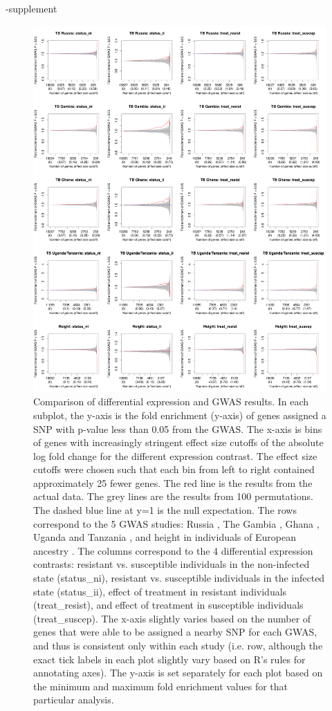 \documentclass[fleqn,10pt]{wlscirep}
\begin{document}
\begin{filecontents}{\jobname-supplement}
\begin{figure}[ht]
\centering
\includegraphics[width=6in]{../figure/gwas-supp.pdf}
\caption{
Comparison of differential expression and GWAS results. In each
subplot, the y-axis is the fold enrichment (y-axis) of genes assigned
a SNP with p-value less than 0.05 from the GWAS. The x-axis is bins of
genes with increasingly stringent effect size cutoffs of the absolute
log fold change for the different expression contrast. The effect size
cutoffs were chosen such that each bin from left to right contained
approximately 25 fewer genes. The red line is the results from the
actual data. The grey lines are the results from 100 permutations. The
dashed blue line at y=1 is the null expectation. The rows correspond
to the 5 GWAS studies: Russia \cite{Curtis2015}, The Gambia
\cite{Thye2010}, Ghana \cite{Thye2010}, Uganda and Tanzania
\cite{Sobota2016}, and height in individuals of European ancestry
\cite{LangoAllen2010}. The columns correspond to the 4 differential
expression contrasts: resistant vs. susceptible individuals in the
non-infected state (status\_ni), resistant vs. susceptible individuals
in the infected state (status\_ii), effect of treatment in resistant
individuals (treat\_resist), and effect of treatment in susceptible
individuals (treat\_suscep). The x-axis slightly varies based on the
number of genes that were able to be assigned a nearby SNP for each
GWAS, and thus is consistent only within each study (i.e. row,
although the exact tick labels in each plot slightly vary based on R’s
rules for annotating axes). The y-axis is set separately for each plot
based on the minimum and maximum fold enrichment values for that
particular analysis.
}
\label{fig:gwas-supp}
\end{figure}


\end{filecontents}
\end{document}
